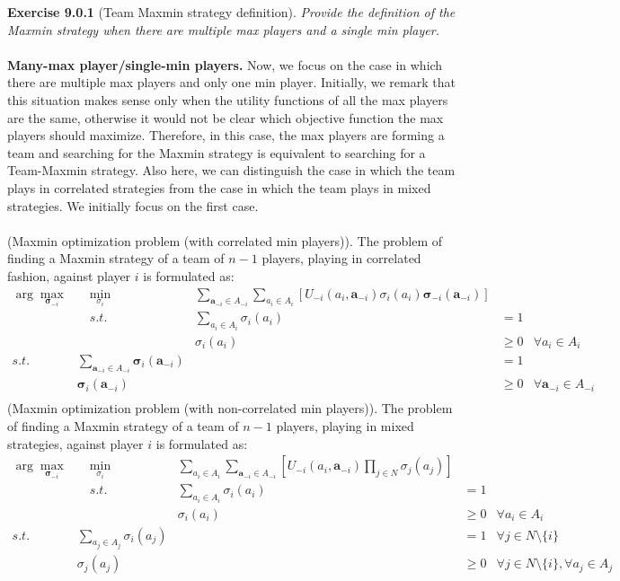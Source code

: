 \textbf{Exercise 9.0.1} (Team Maxmin strategy definition). \textit{Provide the definition of the Maxmin strategy when there are multiple max players and a single min player.}\\\\
\textbf{Many-max player/single-min players.} Now, we focus on the case in which there are multiple max players and only one min player. Initially, we remark that this situation makes sense only when the utility functions of all the max players are the same, otherwise it would not be clear which objective function the max players should maximize. Therefore, in this case, the max players are forming a team and searching for the Maxmin strategy is equivalent to searching for a Team-Maxmin strategy. Also here, we can distinguish the case in which the team plays in correlated strategies from the case in which the team plays in mixed strategies. We initially focus on the first case.\\\\
(Maxmin optimization problem (with correlated min players)). The problem of finding a Maxmin strategy of a team of $n-1$ players, playing in correlated fashion, against player $i$ is formulated as:
\begin{align*}
\arg \max _{\bm{\sigma}_{-i}}  & \quad \min_{\sigma_{i}} & \sum_{\mathbf{a}_{-i} \in A_{-i}} \sum_{a_{i} \in A_{i}}\left[U_{-i}\left(a_{i}, \mathbf{a}_{-i}\right) \sigma_{i}\left(a_{i}\right) \bm{\sigma}_{-i}\left(\mathbf{a}_{-i}\right)\right] & &\\
& \quad s.t. & \sum_{a_{i} \in A_{i}} \sigma_{i}\left(a_{i}\right) & =1\\
& & \sigma_{i}\left(a_{i}\right) & \geqslant 0 & \forall a_{i} \in A_{i}\\
s.t. & \sum_{\mathbf{a}_{-i} \in A_{-i}} \bm{\sigma}_{i}\left(\mathbf{a}_{-i}\right) & & =1\\
& \bm{\sigma}_{i}\left(\mathbf{a}_{-i}\right) & & \geqslant 0 & \forall \mathbf{a}_{-i} \in A_{-i}\\
\end{align*}
\noindent
(Maxmin optimization problem (with non-correlated min players)). The problem of finding a
Maxmin strategy of a team of $n-1$ players, playing in mixed strategies, against player $i$ is formulated as:
\begin{align*}
\arg \max _{\bm{\sigma}_{-i}}  & \quad \min_{\sigma_{i}} & \sum_{a_{i} \in A_{i}} \sum_{\mathbf{a}_{-i} \in A_{-i}} \left[U_{-i}\left(a_{i}, \mathbf{a}_{-i}\right) \prod_{j \in N}{\sigma_j (a_j)} \right] & &\\
& \quad s.t. & \sum_{a_{i} \in A_{i}} \sigma_{i}\left(a_{i}\right) & =1\\
& & \sigma_{i}\left(a_{i}\right) & \geqslant 0 & \forall a_{i} \in A_{i}\\
s.t. & \sum_{a_{j} \in A_{j}} \sigma_{i}\left(a_{j}\right) & & =1 & \forall j \in N \setminus \{i\} \\
& \sigma_{j}\left(a_{j}\right) & & \geqslant 0 & \forall j \in N \setminus \{i\}, \forall a_{j} \in A_{j}\\
\end{align*}
